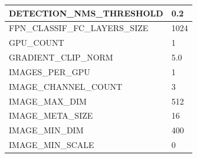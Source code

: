 \begin{longtable}{|l|l|}
	DETECTION\_NMS\_THRESHOLD       & 0.2                                                                                                                                                                                    \\ \hline
	FPN\_CLASSIF\_FC\_LAYERS\_SIZE  & 1024                                                                                                                                                                                   \\ \hline
	GPU\_COUNT                      & 1                                                                                                                                                                                      \\ \hline
	GRADIENT\_CLIP\_NORM            & 5.0                                                                                                                                                                                    \\ \hline
	IMAGES\_PER\_GPU                & 1                                                                                                                                                                                      \\ \hline
	IMAGE\_CHANNEL\_COUNT           & 3                                                                                                                                                                                      \\ \hline
	IMAGE\_MAX\_DIM                 & 512                                                                                                                                                                                    \\ \hline
	IMAGE\_META\_SIZE               & 16                                                                                                                                                                                     \\ \hline
	IMAGE\_MIN\_DIM                 & 400                                                                                                                                                                                    \\ \hline
	IMAGE\_MIN\_SCALE               & 0                                                                                                                                                                                      \\ \hline

\end{longtable}
